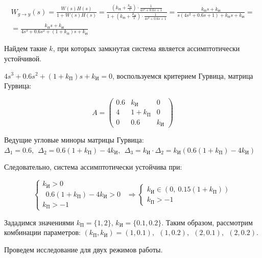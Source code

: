\begin{par}
$$\begin{array}{l}
W_{g\to y} (s)=\frac{W(s)H(s)}{1+W(s)H(s)}=\frac{\left(k_\text{П} +\frac{k_\text{И} }{s}\right)\cdot \frac{1}{4s^2 +0.6s+1}}{1+\left(k_\text{П} +\frac{k_\text{И} }{s}\right)\cdot \frac{1}{4s^2 +0.6s+1}}=\frac{k_\text{П} s+k_\text{И} }{s(4s^2 +0.6s+1)+k_\text{П} s+k_\text{И} }=\\
=\frac{k_\text{П} s+k_\text{И} }{4s^3 +0.6s^2 +(1+k_\text{П} )s+k_\text{И} }
\end{array}$$
\end{par}


Найдем такие $k$, при которых замкнутая система является ассимптотически устойчивой.


$4s^3 +0.6s^2 +(1+k_\text{П} )s+k_\text{И} =0$, воспользуемся критерием Гурвица, матрица Гурвица:

\begin{par}
$$A=\left(\begin{array}{ccc}
0.6 & k_\text{И}  & 0\\
4 & 1+k_\text{П}  & 0\\
0 & 0.6 & k_\text{И} 
\end{array}\right)$$
\end{par}


Ведущие угловые миноры матрицы Гурвица: $\Delta_1 =0.6,~~\Delta_2 =0.6(1+k_\text{П} )-4k_\text{И} ,~~\Delta_3 =k_\text{И} \cdot \Delta_2 =k_\text{И} (0.6(1+k_\text{П} )-4k_\text{И} )$


Следовательно, система ассимптотически устойчива при:

\begin{par}
$$\left\lbrace \begin{array}{c}
k_\text{И} >0\\
~~0.6(1+k_\text{П} )-4k_\text{И} >0\\
k_\text{П} >-1
\end{array}\right.~~\Rightarrow \left\lbrace \begin{array}{c}
k_\text{И} \in \left(0,~0.15(1+k_\text{П} )\right)\\
k_\text{П} >-1
\end{array}\right.$$
\end{par}


Зададимся значениями $k_\text{П} =\lbrace 1,2\rbrace$, $k_\text{И} =\lbrace 0.1,0.2\rbrace$. Таким образом, рассмотрим комбинации параметров: $(k_\text{П} ,k_\text{И} )=(1,0.1),~~(1,0.2),~~(2,0.1),~~(2,0.2)$.


Проведем исследование для двух режимов работы.



